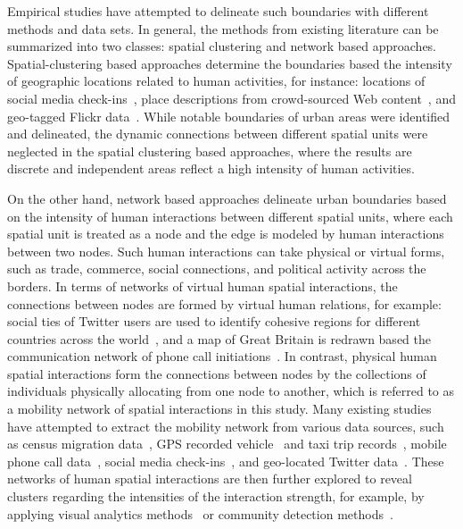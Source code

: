 \documentclass[]{tGIS2e}
\begin{document}
Empirical studies have attempted to delineate such boundaries with different methods and data sets.
In general, the methods from existing literature can be summarized into two classes: spatial clustering and network based approaches.
Spatial-clustering based approaches determine the boundaries based the intensity of geographic locations related to human activities, for instance: locations of social media check-ins~\citep{cranshaw2012,jiang2015,sun2016}, place descriptions from crowd-sourced Web content~\citep{vasardani2013}, and geo-tagged Flickr data~\citep{stefanidis2013,hu2016}.
While notable boundaries of urban areas were identified and delineated, the dynamic connections between different spatial units were neglected in the spatial clustering based approaches, where the results are discrete and independent areas reflect a high intensity of human activities.

On the other hand, network based approaches delineate urban boundaries based on the intensity of human interactions between different spatial units, where each spatial unit is treated as a node and the edge is modeled by human interactions between two nodes.
Such human interactions can take physical or virtual forms, such as trade, commerce, social connections, and political activity across the borders.
In terms of networks of virtual human spatial interactions, the connections between nodes are formed by virtual human relations, for example: social ties of Twitter users are used to identify cohesive regions for different countries across the world~\citep{kallus2015}, and a map of Great Britain is redrawn based the communication network of phone call initiations~\citep{ratti2010}.
In contrast, physical human spatial interactions form the connections between nodes by the collections of individuals physically allocating from one node to another, which is referred to as a mobility network of spatial interactions in this study.
Many existing studies have attempted to extract the mobility network from various data sources, such as census migration data~\citep{rae2009}, GPS recorded vehicle~\citep{rinzivillo2012} and taxi trip records~\citep{liu2015}, mobile phone call data~\citep{sobolevsky2013,zhong2014}, social media check-ins~\citep{liu2014}, and geo-located Twitter data~\citep{hawelka,gao2014}.
These networks of human spatial interactions are then further explored to reveal clusters regarding the intensities of the interaction strength, for example, by applying visual analytics methods~\citep{rae2009} or community detection methods~\citep{coscia2011}.
\end{document}
